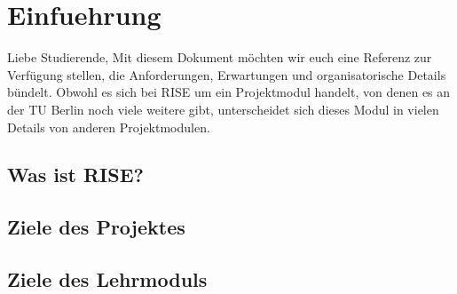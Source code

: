 \section{Einfuehrung}

Liebe Studierende,
Mit diesem Dokument möchten wir euch eine Referenz zur Verfügung stellen, die Anforderungen, Erwartungen und organisatorische Details bündelt. Obwohl es sich bei RISE um ein Projektmodul handelt, von denen es an der TU Berlin noch viele weitere gibt, unterscheidet sich dieses Modul in vielen Details von anderen Projektmodulen. 

\subsection{Was ist RISE?}

\subsection{Ziele des Projektes}

\subsection{Ziele des Lehrmoduls}

\newpage
